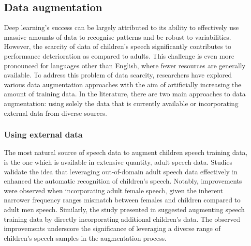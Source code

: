 \subsection{Data augmentation}%
Deep learning's success can be largely attributed to its ability to effectively use massive amounts of data to recognise patterns  and be robust to variabilities. However, the scarcity of data of children's speech significantly contributes to performance deterioration as compared to adults. This challenge is even more pronounced for languages other than English, where fewer resources are generally available. To address this problem of data scarcity, researchers have explored various data augmentation approaches with the aim of artificially increasing the amount of training data. In the literature, there are two main approaches to data augmentation: using solely the data that is currently available or incorporating external data from diverse sources.

\subsubsection{Using external data}

The most natural source of speech data to augment children speech training data, is the one which is available in extensive quantity, adult speech data. Studies \cite{adultAUGMENT1, adultAUGMENT2} validate the idea  that leveraging out-of-domain adult speech data effectively in enhanced the automatic recognition of children's speech. Notably, improvements were observed when incorporating adult female speech, given the inherent narrower frequency ranges mismatch between females and children compared to adult men speech.
Similarly, the study presented in \cite{nonnative} suggested augmenting speech training data by directly incorporating additional children's data. The observed improvements underscore the significance of leveraging a diverse range of children's speech samples in the augmentation process.


